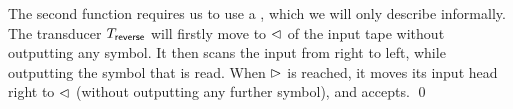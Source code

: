 \begin{example}
%
%
The second function requires us to use a \FFT{}, which we will only describe
informally. The transducer $T_{\sf reverse}$ will firstly move to $\vartriangleleft$ of the input tape
    without outputting any symbol. It then scans the input from
    right to left, while outputting the symbol that is read.
    When $\vartriangleright$ is reached, it moves its input head right to $\vartriangleleft$ (without outputting any further symbol), and accepts.     \qed
\end{example}



